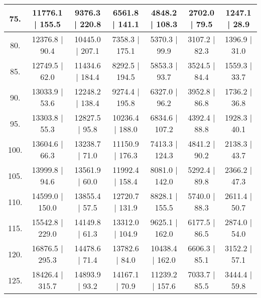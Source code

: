 \begin{tabular}{|c||c|c|c|c|c|c|}
\hline
  75. &  11776.1 |   155.5 &   9376.3 |   220.8 &   6561.8 |   141.1 &   4848.2 |   108.3 &   2702.0 |    79.5 &   1247.1 |    28.9\tabularnewline
\hline
  80. &  12376.8 |    90.4 &  10445.0 |   207.1 &   7358.3 |   175.1 &   5370.3 |    99.9 &   3107.2 |    82.3 &   1396.9 |    31.0\tabularnewline
\hline
  85. &  12749.5 |    62.0 &  11434.6 |   184.4 &   8292.5 |   194.5 &   5853.3 |    93.7 &   3524.5 |    84.4 &   1559.3 |    33.7\tabularnewline
\hline
  90. &  13033.9 |    53.6 &  12248.2 |   138.4 &   9274.4 |   195.8 &   6327.0 |    96.2 &   3952.8 |    86.8 &   1736.2 |    36.8\tabularnewline
\hline
  95. &  13303.8 |    55.3 &  12827.5 |    95.8 &  10236.4 |   188.0 &   6834.6 |   107.2 &   4392.4 |    88.8 &   1928.3 |    40.1\tabularnewline
\hline
 100. &  13604.6 |    66.3 &  13238.7 |    71.0 &  11150.9 |   176.3 &   7413.3 |   124.3 &   4841.2 |    90.2 &   2138.3 |    43.7\tabularnewline
\hline
 105. &  13999.8 |    94.6 &  13561.9 |    60.0 &  11992.4 |   158.4 &   8081.0 |   142.0 &   5292.4 |    89.8 &   2366.2 |    47.3\tabularnewline
\hline
 110. &  14599.0 |   150.0 &  13855.4 |    57.5 &  12720.7 |   131.9 &   8828.1 |   155.5 &   5740.0 |    88.3 &   2611.4 |    50.7\tabularnewline
\hline
 115. &  15542.8 |   229.0 &  14149.8 |    61.3 &  13312.0 |   104.9 &   9625.1 |   162.0 &   6177.5 |    86.5 &   2874.0 |    54.0\tabularnewline
\hline
 120. &  16876.5 |   295.3 &  14478.6 |    71.4 &  13782.6 |    84.0 &  10438.4 |   162.0 &   6606.3 |    85.1 &   3152.2 |    57.1\tabularnewline
\hline
 125. &  18426.4 |   315.7 &  14893.9 |    93.2 &  14167.1 |    70.9 &  11239.2 |   157.6 &   7033.7 |    85.5 &   3444.4 |    59.8\tabularnewline
\hline
\end{tabular}
